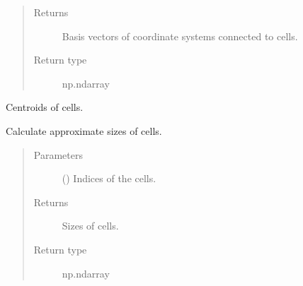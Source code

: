 \documentclass[letterpaper,10pt,english]{sphinxmanual}
\begin{document}
\begin{fulllineitems}
\begin{fulllineitems}
\begin{quote}
\begin{description}
\item[{Returns}] \leavevmode
Basis vectors of coordinate systems connected to cells.

\item[{Return type}] \leavevmode
np.ndarray

\end{description}\end{quote}

\end{fulllineitems}


\begin{fulllineitems}
\label{\detokenize{api/grids:geology.src.CornerPointGrid.cell_centroids}}
Centroids of cells.

\end{fulllineitems}


\begin{fulllineitems}
\label{\detokenize{api/grids:geology.src.CornerPointGrid.cell_sizes}}
Calculate approximate sizes of cells.
\begin{quote}\begin{description}
\item[{Parameters}] \leavevmode
{} (\sphinxstyleliteralemphasis{\sphinxupquote{{[}}}\sphinxstyleliteralemphasis{\sphinxupquote{{]}}}) \textendash{} Indices of the cells.

\item[{Returns}] \leavevmode
Sizes of cells.

\item[{Return type}] \leavevmode
np.ndarray

\end{description}\end{quote}

\end{fulllineitems}



\end{fulllineitems}
\end{document}

